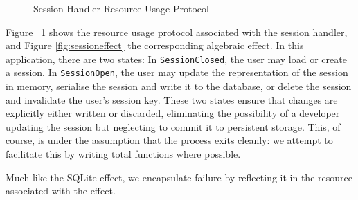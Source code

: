 \begin{figure*}[t]
\begin{center}
\end{center}
\caption{Session Effect}
\label{fig:sessioneffect}
\end{figure*}

\begin{figure}[htpb!]
\centering
{}
\caption{Session Handler Resource Usage Protocol}
\label{fig:sessionstates}
\end{figure}

Figure ~\ref{fig:sessionstates} shows the resource usage protocol associated
with the session handler, and Figure \ref{fig:sessioneffect} the corresponding
algebraic effect. In this application, there are two states:
In \texttt{SessionClosed}, the user may load or create a
session.
In \texttt{SessionOpen}, the user may update the
representation of the session in memory, serialise the session and write it to
the database, or delete the session and invalidate the user's session key. 
These two states ensure that changes are explicitly either
written or discarded, eliminating the possibility of a developer updating the
session but neglecting to commit it to persistent storage. This, of course, is
under the assumption that the process exits cleanly: we attempt to facilitate
this by writing total functions where possible.

Much like the SQLite effect, we encapsulate failure by reflecting it in the
resource associated with the effect. 


